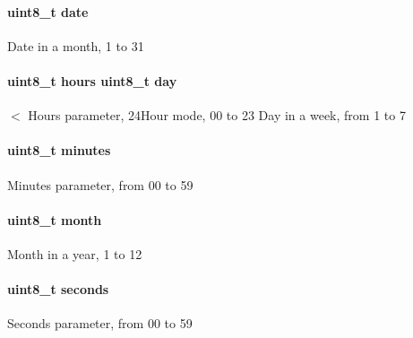 \paragraph[{date}]{\setlength{\rightskip}{0pt plus 5cm}uint8\+\_\+t date}\label{struct_t_m___r_t_c__t_a30ca8635d0267ef5190a408d7a134f7e}
Date in a month, 1 to 31 \hypertarget{struct_t_m___r_t_c__t_a10f9f555e8de6ed6d41f7c7621cc877d}{}
\paragraph[{day}]{\setlength{\rightskip}{0pt plus 5cm}uint8\+\_\+t hours uint8\+\_\+t day}\label{struct_t_m___r_t_c__t_a10f9f555e8de6ed6d41f7c7621cc877d}
$<$ Hours parameter, 24\+Hour mode, 00 to 23 Day in a week, from 1 to 7 \hypertarget{struct_t_m___r_t_c__t_a7acca8be0094a19be6e308ac05924c4f}{}
\paragraph[{minutes}]{\setlength{\rightskip}{0pt plus 5cm}uint8\+\_\+t minutes}\label{struct_t_m___r_t_c__t_a7acca8be0094a19be6e308ac05924c4f}
Minutes parameter, from 00 to 59 \hypertarget{struct_t_m___r_t_c__t_a3e00faf7fbf9805e9ec4d2edd6339050}{}
\paragraph[{month}]{\setlength{\rightskip}{0pt plus 5cm}uint8\+\_\+t month}\label{struct_t_m___r_t_c__t_a3e00faf7fbf9805e9ec4d2edd6339050}
Month in a year, 1 to 12 \hypertarget{struct_t_m___r_t_c__t_a46729a903be1a03cdb248fb48d84d4f5}{}
\paragraph[{seconds}]{\setlength{\rightskip}{0pt plus 5cm}uint8\+\_\+t seconds}\label{struct_t_m___r_t_c__t_a46729a903be1a03cdb248fb48d84d4f5}
Seconds parameter, from 00 to 59 \hypertarget{struct_t_m___r_t_c__t_a077301f5916fde6c214879726fec4bc3}{}
